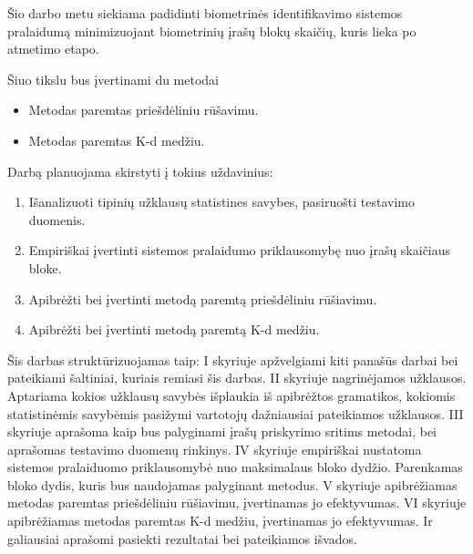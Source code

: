 Šio darbo metu siekiama padidinti biometrinės identifikavimo sistemos \cite{NeurotechnologyMegamatcherAccelerator} pralaidumą minimizuojant biometrinių įrašų blokų skaičių, kuris lieka po atmetimo etapo.

Šiuo tikslu bus įvertinami du metodai
\begin{itemize}
		\item Metodas paremtas priešdėliniu rūšavimu.
		\item Metodas paremtas K-d medžiu.
\end{itemize}

Darbą planuojama skirstyti į tokius uždavinius:

\begin{enumerate}
	\item Išanalizuoti tipinių užklausų statistines savybes, pasiruošti testavimo duomenis.
	\item Empiriškai įvertinti sistemos pralaidumo priklausomybę nuo įrašų skaičiaus bloke.
	\item Apibrėžti bei įvertinti metodą paremtą priešdėliniu rūšiavimu.
	\item Apibrėžti bei įvertinti metodą paremtą K-d medžiu.
\end{enumerate}

Šis darbas struktūrizuojamas taip:
I skyriuje apžvelgiami kiti panašūs darbai bei pateikiami šaltiniai, kuriais remiasi šis darbas.
II skyriuje nagrinėjamos užklausos.
Aptariama kokios užklausų savybės išplaukia iš apibrėžtos gramatikos, kokiomis statistinėmis savybėmis pasižymi vartotojų dažniausiai pateikiamos užklausos.
III skyriuje aprašoma kaip bus palyginami įrašų priskyrimo sritims metodai, bei aprašomas testavimo duomenų rinkinys.
IV skyriuje empiriškai nustatoma sistemos pralaiduomo priklausomybė nuo maksimalaus bloko dydžio.
Parenkamas bloko dydis, kuris bus naudojamas palyginant metodus.
V skyriuje apibrėžiamas metodas paremtas priešdėliniu rūšiavimu, įvertinamas jo efektyvumas.
VI skyriuje apibrėžiamas metodas paremtas K-d medžiu, įvertinamas jo efektyvumas.
Ir galiausiai aprašomi pasiekti rezultatai bei pateikiamos išvados.


